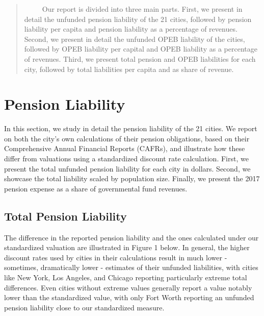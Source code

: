 \documentclass[12pt]{article}
\begin{document}
\begin{center}
\begin{quote}
~~~~~Our report is divided into three main parts. First, we present in
detail the unfunded pension liability of the 21 cities, followed by
pension liability per capita and pension liability as a percentage of
revenues. Second, we present in detail the unfunded OPEB liability of
the cities, followed by OPEB liability per capital and OPEB liability
as a percentage of revenues. Third, we present total pension and OPEB
liabilities for each city, followed by total liabilities per capita and
as share of revenue. 

\end{quote}

\end{center}

\section{Pension Liability}

In this section, we study in detail the pension liability of the 21
cities. We report on both the city's own calculations of their pension
obligations, based on their Comprehensive Annual Financial Reports
(CAFRs), and illustrate how these differ from valuations using a
standardized discount rate calculation. First, we present the total
unfunded pension liability for each city in dollars. Second, we showcase
the total liability scaled by population size. Finally, we present the
2017 pension expense as a share of governmental fund revenues.


\subsection{Total Pension
Liability}

The difference in the reported pension liability and the ones calculated
under our standardized valuation are illustrated in Figure 1 below. In
general, the higher discount rates used by cities in their calculations
result in much lower - sometimes, dramatically lower - estimates of
their unfunded liabilities, with cities like New York, Los Angeles, and
Chicago reporting particularly extreme total differences. Even cities
without extreme values generally report a value notably lower than the
standardized value, with only Fort Worth reporting an unfunded pension
liability close to our standardized measure.
\end{document}
